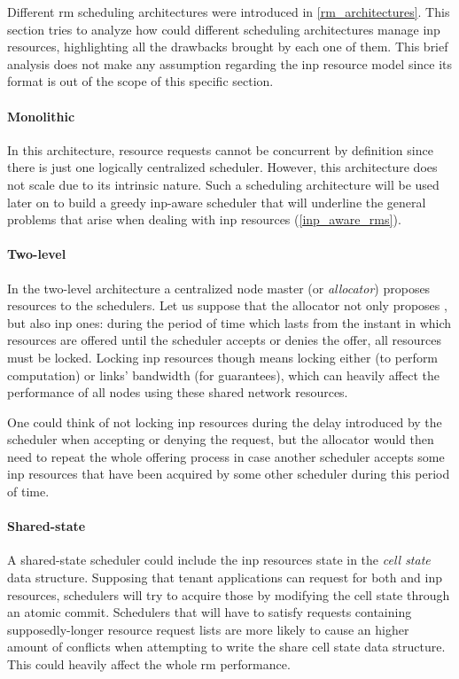 Different \gls{rm} scheduling architectures were introduced in \autoref{rm_architectures}.
This section tries to analyze how could different scheduling architectures manage \gls{inp} resources, highlighting all the drawbacks brought by each one of them.
This brief analysis does not make any assumption regarding the \gls{inp} resource model since its format is out of the scope of this specific section.

\paragraph{Monolithic}
In this architecture, resource requests cannot be concurrent by definition since there is just one logically centralized scheduler.
However, this architecture does not scale due to its intrinsic nature.
Such a scheduling architecture will be used later on to build a greedy \gls{inp}-aware scheduler that will underline the general problems that arise when dealing with \gls{inp} resources (\autoref{inp_aware_rms}).

\paragraph{Two-level}
In the two-level architecture a centralized node master (or \textit{allocator}) proposes resources to the schedulers.
Let us suppose that the allocator not only proposes , but also \gls{inp} ones: during the period of time which lasts from the instant in which resources are offered until the scheduler accepts or denies the offer, all resources must be locked.
Locking \gls{inp} resources though means locking either  (to perform computation) or links' bandwidth (for guarantees), which can heavily affect the performance of all nodes using these shared network resources.\par
One could think of not locking \gls{inp} resources during the delay introduced by the scheduler when accepting or denying the request, but the allocator would then need to repeat the whole offering process in case another scheduler accepts some \gls{inp} resources that have been acquired by some other scheduler during this period of time.

\paragraph{Shared-state}
A shared-state scheduler could include the \gls{inp} resources state in the \textit{cell state} data structure.
Supposing that tenant applications can request for both  and \gls{inp} resources, schedulers will try to acquire those by modifying the cell state through an atomic commit.
Schedulers that will have to satisfy requests containing supposedly-longer resource request lists are more likely to cause an higher amount of conflicts when attempting to write the share cell state data structure.
This could heavily affect the whole \gls{rm} performance.